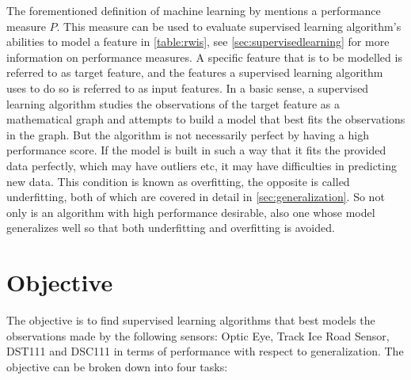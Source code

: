 	The forementioned definition of machine learning by \cite{BOOK:2} mentions a performance measure $P$. This measure can be used to evaluate supervised learning algorithm's abilities to model a feature in \ref{table:rwis}, see \ref{sec:supervisedlearning} for more information on performance measures. A specific feature that is to be modelled is referred to as target feature, and the features a supervised learning algorithm uses to do so is referred to as input features. In a basic sense, a supervised learning algorithm studies the observations of the target feature as a mathematical graph and attempts to build a model that best fits the observations in the graph. But the algorithm is not necessarily perfect by having a high performance score. If the model is built in such a way that it fits the provided data perfectly, which may have outliers etc, it may have difficulties in predicting new data. This condition is known as overfitting, the opposite is called underfitting, both of which are covered in detail in \ref{sec:generalization}. So not only is an algorithm with high performance desirable, also one whose model generalizes well so that both underfitting and overfitting is avoided.

\section{Objective}
	The objective is to find supervised learning algorithms that best models the observations made by the following sensors: Optic Eye, Track Ice Road Sensor, DST111 and DSC111 in terms of performance with respect to generalization. The objective can be broken down into four tasks:
	
